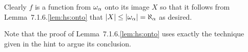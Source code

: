 \begin{solution}
	Clearly $f$ is a function from $\omega_\alpha$ onto its image $X$ so that it follows from Lemma~7.1.6.\ref{lem:hs:onto} that $\left| X \right| \leq \left| \omega_\alpha \right| = \aleph_\alpha$ as desired. \qedsymbol
    
    Note that the proof of Lemma~7.1.6.\ref{lem:hs:onto} uses exactly the technique given in the hint to argue its conclusion.
\end{solution}
